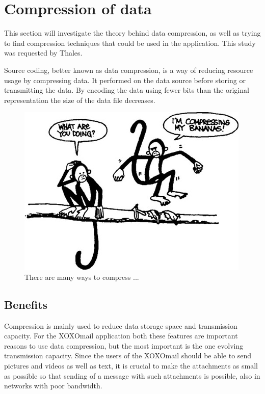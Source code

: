 
\section{Compression of data}

This section will investigate the theory behind data compression, as well as trying to find compression techniques that could be used in the application. This study was requested by Thales.
\newline

Source coding, better known as data compression, is a way of reducing resource usage by compressing data. It performed on the data source before storing or transmitting the data. By encoding the data using fewer bits than the original representation the size of the data file decreases.

\begin{figure}[h!]
\begin{center}
\includegraphics[scale=0.5]{compressionmonkeys}
\caption{There are many ways to compress ... \cite{bib:compressionImage}}
\end{center}
\end{figure}

\subsection{Benefits}
Compression is mainly used to reduce data storage space and transmission capacity. For the XOXOmail application both these features are important reasons to use data compression, but the most important is the one evolving transmission capacity. Since the users of the XOXOmail should be able to send pictures and videos as well as text, it is crucial to make the attachments as small as possible so that sending of a message with such attachments is possible, also in networks with poor bandwidth.

